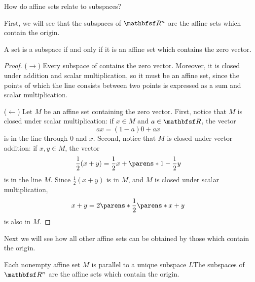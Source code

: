 
\sbasic































\sstart
{}


How do affine sets relate to subspaces?


First, we will see that the subspaces of $\R^n$ are the affine sets which contain the origin.

\begin{prop}

A set is a subspace if and only if it is an affine set which contains the zero vector.

\begin{proof}

($\rightarrow$) Every subspace of contains the zero vector. Moreover, it is closed under addition and scalar multiplication, so it must be an affine set, since the points of which the line consists between two points is expressed as a sum and scalar multiplication.

($\leftarrow$) Let $M$ be an affine set containing the zero vector. First, notice that $M$ is closed under scalar multiplication: if $x \in M$ and $a \in \R$, the vector
$$
  ax = (1 - a)0 + ax
$$
is in the line through $0$ and $x$.
Second, notice that $M$ is closed under vector addition: if $x, y \in M$, the vector
$$
  \frac{1}{2}(x + y) = \frac{1}{2}x + \parens*{1 - \frac{1}{2}}y
$$
is in the line $M$.
  Since $\frac{1}{2}(x + y)$ is in $M$, and $M$ is closed under scalar multiplication,
$$
  x + y = 2\parens*{\frac{1}{2}\parens*{x + y}}
$$
is also in $M$.

\end{proof}

\end{prop}

Next we will see how all other affine sets can be obtained by those which contain the origin.

\begin{prop}

Each nonempty affine set $M$ is parallel to a unique subspace $L$The subspaces of $\R^n$ are the affine sets which contain the origin.

\end{prop}
\strats
